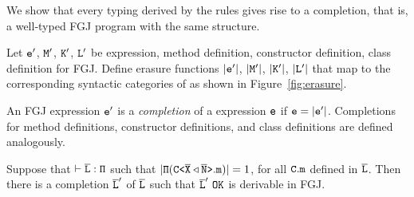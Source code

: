 We show that every typing derived by the \TFGJ rules gives rise to a
completion, that is, a well-typed FGJ program with the same structure.
\begin{definition}[Erasure]\label{def:erasure}
  Let ${\tt e}'$, ${\tt M}'$, ${\tt K}'$, ${\tt L}'$ be expression, method definition, constructor definition, class definition for FGJ. Define erasure functions 
  $|{\tt e}'|$, $|{\tt M}'|$, $|{\tt K}'|$,
  $|{\tt L}'|$ that map to the corresponding syntactic categories
  of \TFGJ as shown in Figure~\ref{fig:erasure}.
  \end{definition}
\begin{definition}[Completion]\label{def:completion}
  An FGJ expression ${\tt e}'$ is a \emph{completion} of a \TFGJ expression ${\tt e}$ if ${\tt e} = |{\tt e}'|$. Completions for method definitions, constructor definitions, and class definitions
  are defined analogously.
\end{definition}
\begin{theorem}
  Suppose that $\mathtt{\vdash \overline{\tt L} : \Pi}$ such that $|\mathtt{\Pi (\mathtt{C \texttt{<} \overline{\tt X} \triangleleft \overline{\tt N} \texttt{>} }.m)}| = 1$, for all ${\tt C.m}$ defined in $\overline{\tt L}$. Then there is a completion $\overline{\tt L}'$ of $\overline{\tt L}$ such that
  $\ol{L}'\ \mathtt{OK}$ is derivable in FGJ.
\end{theorem}
